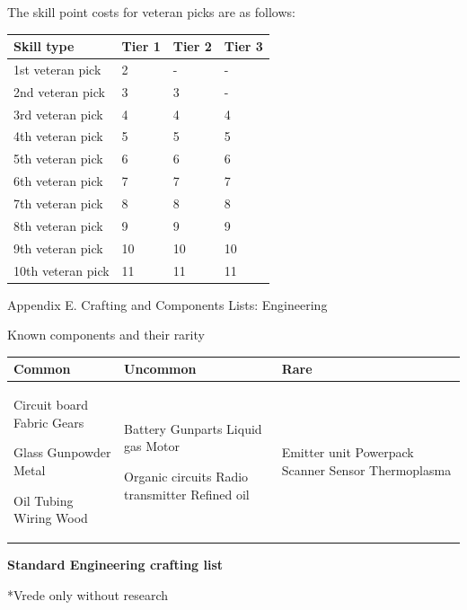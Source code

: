 The skill point costs for veteran picks are as follows:

\begin{table}
\begin{tabular}{|l|l|l|l|} \hline 
Skill type & Tier 1 & Tier 2 & Tier 3 \\
 \hline 1st veteran pick & 2 & - & - \\
 \hline 2nd veteran pick & 3 & 3 & - \\
 \hline 3rd veteran pick & 4 & 4 & 4 \\
 \hline 4th veteran pick & 5 & 5 & 5 \\
 \hline 5th veteran pick & 6 & 6 & 6 \\
 \hline 6th veteran pick & 7 & 7 & 7 \\
 \hline 7th veteran pick & 8 & 8 & 8 \\
 \hline 8th veteran pick & 9 & 9 & 9 \\
 \hline 9th veteran pick & 10 & 10 & 10 \\
 \hline 10th veteran pick & 11 & 11 & 11 \\
 \hline \end{tabular}

\end{table}

Appendix E. Crafting and Components Lists: Engineering

Known components and their rarity

\begin{table}
\begin{tabular}{|l|l|l|} \hline 
Common & Uncommon & Rare \\
 \hline Circuit board Fabric Gears\par Glass Gunpowder Metal\par Oil Tubing Wiring Wood & Battery Gunparts Liquid gas Motor\par Organic circuits Radio transmitter Refined oil & Emitter unit Powerpack Scanner Sensor Thermoplasma \\
 \hline \end{tabular}

\end{table}

\textbf{Standard Engineering crafting list}

*Vrede only without research

